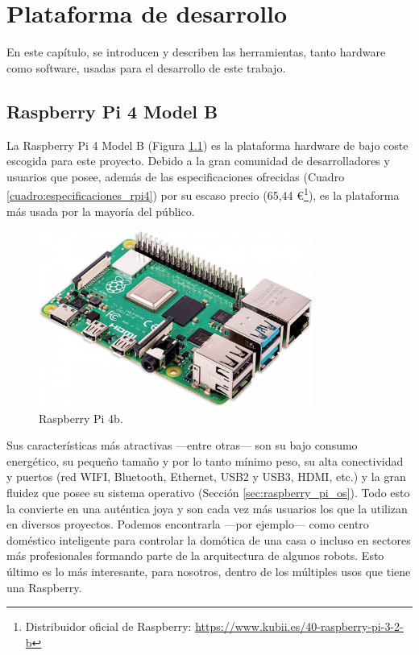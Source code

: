 \chapter{Plataforma de desarrollo}
\label{cap:capitulo3}

\vspace{1cm}

En este capítulo, se introducen y describen las herramientas, tanto hardware como software, usadas para el desarrollo de este trabajo.

\section{Raspberry Pi 4 Model B}
\label{sec:rpi}

La Raspberry Pi 4 Model B (Figura \ref{fig:raspberry2}) es la plataforma hardware de bajo coste escogida para este proyecto. Debido a la gran comunidad de desarrolladores y usuarios que posee, además de las especificaciones ofrecidas (Cuadro \ref{cuadro:especificaciones_rpi4}) por su escaso precio (65,44 \euro\footnote{Distribuidor oficial de Raspberry: \url{https://www.kubii.es/40-raspberry-pi-3-2-b}}), es la plataforma más usada por la mayoría del público.\\

\begin{figure} [h!]
  \begin{center}
    \includegraphics[width=9cm]{figs/raspberry.jpg}
  \end{center}
  \caption{Raspberry Pi 4b.}
  \label{fig:raspberry2}
\end{figure}

Sus características más atractivas ---entre otras--- son su bajo consumo energético, su pequeño tamaño y por lo tanto mínimo peso, su alta conectividad y puertos (red WIFI, Bluetooth, Ethernet, USB2 y USB3, HDMI, etc.) y la gran fluidez que posee su sistema operativo (Sección \ref{sec:raspberry_pi_os}). Todo esto la convierte en una auténtica joya y son cada vez más usuarios los que la utilizan en diversos proyectos. Podemos encontrarla ---por ejemplo--- como centro doméstico inteligente para controlar la domótica de una casa o incluso en sectores más profesionales formando parte de la arquitectura de algunos robots. Esto último es lo más interesante, para nosotros, dentro de los múltiples usos que tiene una Raspberry.\\

